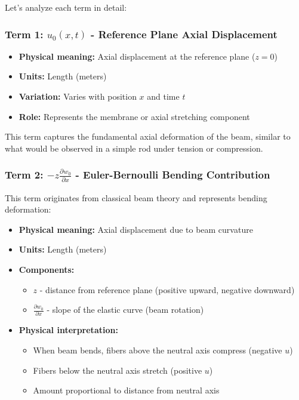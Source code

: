\documentclass[12pt,a4paper]{article}
\begin{document}
Let's analyze each term in detail:

\subsubsection{Term 1: $u_0(x,t)$ - Reference Plane Axial Displacement}

\begin{itemize}
\item \textbf{Physical meaning:} Axial displacement at the reference plane ($z=0$)
\item \textbf{Units:} Length (meters)
\item \textbf{Variation:} Varies with position $x$ and time $t$
\item \textbf{Role:} Represents the membrane or axial stretching component
\end{itemize}

This term captures the fundamental axial deformation of the beam, similar to what would be observed in a simple rod under tension or compression.

\subsubsection{Term 2: $-z \frac{\partial w_0}{\partial x}$ - Euler-Bernoulli Bending Contribution}

This term originates from classical beam theory and represents bending deformation:

\begin{itemize}
\item \textbf{Physical meaning:} Axial displacement due to beam curvature
\item \textbf{Units:} Length (meters)
\item \textbf{Components:}
    \begin{itemize}
    \item $z$ - distance from reference plane (positive upward, negative downward)
    \item $\frac{\partial w_0}{\partial x}$ - slope of the elastic curve (beam rotation)
    \end{itemize}
\item \textbf{Physical interpretation:}
    \begin{itemize}
    \item When beam bends, fibers above the neutral axis compress (negative $u$)
    \item Fibers below the neutral axis stretch (positive $u$)
    \item Amount proportional to distance from neutral axis
    \end{itemize}
\end{itemize}
\end{document}
